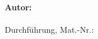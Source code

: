 \begin{titlepage}
\vspace{1.5em}
\normalsize 
\begin{center}
	\textbf{\textsf{Autor:}}\\ \vspace{0.25em}
	\IUMSauthor\\ \vspace{0.25em}
	Durchführung, Mat.-Nr.: \IUMSmatNr	
\end{center}
%


\end{titlepage}


\hypersetup{pageanchor=true}
